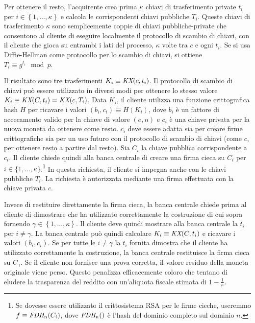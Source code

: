\documentclass{article}
\begin{document}
Per ottenere il resto, l'acquirente crea prima $\kappa$ chiavi di
trasferimento private $t_{i}$ per
$i \in \left\{ 1,\ldots,\kappa \right\}$ e calcola le
corrispondenti chiavi pubbliche $T_{i}$. Queste chiavi di
trasferimento $\kappa$ sono semplicemente coppie di chiavi
pubbliche-private che consentono al cliente di eseguire localmente il
protocollo di scambio di chiavi, con il cliente che gioca su entrambi
i lati del processo, $\kappa$ volte tra $c$ e ogni $t_{i}$.
Se si usa Diffie-Hellman come protocollo per lo scambio di chiavi, si
ottiene
$T_{i} \equiv g^{t_{i}} \mod p$.

Il risultato sono tre trasferimenti
$K_{i} \equiv \emph{KX}(c,t_{i})$. Il protocollo di scambio di chiavi
può essere utilizzato in diversi modi per ottenere lo stesso valore
$K_{i} \equiv \emph{KX}(C,t_{i}) = \emph{KX}(c,T_{i})$.
Data $K_{i}$, il cliente utilizza una funzione crittografica hash $H$
per ricavare i valori
$(b_{i},c_{i}) \equiv H(K_{i})$, dove
$b_{i}$ è un fattore di accecamento valido per la chiave di valore
$(e,n)$ e $c_{i}$
è una chiave privata per la nuova moneta da ottenere come resto.
$c_{i}$ deve essere adatta sia per creare firme crittografiche sia per
un uso futuro con il protocollo di scambio di chiavi
(come $c$, per ottenere resto a partire dal resto).
Sia $C_{i}$ la chiave pubblica corrispondente a $c_{i}$.
Il cliente chiede quindi alla banca centrale di creare una firma cieca su
$C_{i}$ per $i \in \{ 1,\ldots,\kappa\}$.\footnote{Se dovesse essere
utilizzato il crittosistema RSA per le firme cieche, useremmo
$f \equiv \emph{FDH}_{n}(C_{i})$, dove
$\emph{FDH}_{n}()$
è l'hash del dominio completo sul dominio $n$.} In questa richiesta, il
cliente si impegna anche con le chiavi pubbliche
$T_{i}$.
La richiesta è autorizzata mediante una firma effettuata con la chiave
privata $c$.

Invece di restituire direttamente la firma cieca, la banca centrale
chiede prima al cliente di dimostrare che ha utilizzato correttamente la
costruzione di cui sopra fornendo
$\gamma \in \left\{ 1,\ldots,\kappa \right\}$.
Il cliente deve quindi mostrare alla banca centrale la
$t_{i}$ per $i \neq \gamma$.
La banca centrale può quindi calcolare
$K_{i} \equiv \emph{KX}(C,t_{i})$ e ricavare i valori
$(b_{i},c_{i})$. Se per tutte le
$i \neq \gamma$ la $t_{i}$ fornita dimostra che il cliente ha utilizzato
correttamente la costruzione, la banca centrale restituisce la firma
cieca su $C_{\gamma}$.
Se il cliente non fornisce una prova corretta, il valore residuo della
moneta originale viene perso. Questo penalizza efficacemente coloro che
tentano di eludere la trasparenza del reddito con un'aliquota fiscale
stimata di $1 - \frac{1}{\kappa}$.
\end{document}
